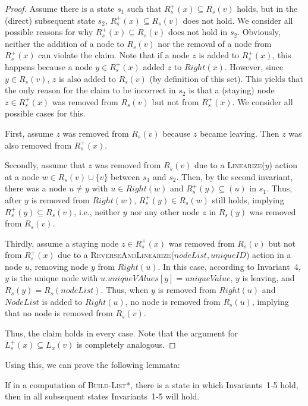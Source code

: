 \documentclass[a4paper,USenglish]{lipics}
\newcommand{\blpp}{\textsc{Build-List*}\xspace}
\newcommand{\linearize}[1]{\textsc{Linearize(\ensuremath{#1})}\xspace}
\newcommand{\rsp}{\ensuremath{R_s^+}\xspace}
\newcommand{\lsp}{\ensuremath{L_s^+}\xspace}
\newcommand{\revandlin}[1]{\textsc{ReverseAndLinearize(\ensuremath{#1})}\xspace} \newcommand{\revandlinREQ}[1]{\textsc{ReverseAndLinearizeREQ(#1)}\xspace}
\begin{document}
\begin{proof}
Assume there is a state $s_1$ such that $\rsp(x) \subseteq R_s(v)$ holds, but in the (direct) subsequent state $s_2$, $\rsp(x) \subseteq R_s(v)$ does not hold.
We consider all possible reasons for why $\rsp(x) \subseteq R_s(v)$ does not hold in $s_2$.
Obviously, neither the addition of a node to $R_s(v)$ nor the removal of a node from $\rsp(x)$ can violate the claim.
Note that if a node $z$ is added to $\rsp(x)$, this happens because a node $y \in \rsp(x)$ added $z$ to $Right(x)$.
However, since $y \in R_s(v)$, $z$ is also added to $R_s(v)$ (by definition of this set).
This yields that the only reason for the claim to be incorrect in $s_2$ is that a (staying) node $z \in \rsp(x)$ was removed from $R_s(v)$ but not from $\rsp(x)$.
We consider all possible cases for this.

First, assume $z$ was removed from $R_s(v)$ because $z$ became leaving.
Then $z$ was also removed from $\rsp(x)$.

Secondly, assume that $z$ was removed from $R_s(v)$ due to a \linearize{y} action at a node $w \in R_s(v) \cup \{v\}$ between $s_1$ and $s_2$.
Then, by the second invariant, there was a node $u \neq y$ with $u \in Right(w)$ and $\rsp(y) \subseteq(u)$ in $s_1$.
Thus, after $y$ is removed from $Right(w)$, $\rsp(y) \in R_s(w)$ still holds, implying $\rsp(y) \subseteq R_s(v)$, i.e., neither $y$ nor any other node $z$ in $R_s(y)$ was removed from $R_s(v)$.

Thirdly, assume a staying node $z \in \rsp(x)$ was removed from $R_s(v)$ but not from $\rsp(x)$ due to a \revandlin{nodeList,uniqueID} action in a node $u$, removing node $y$ from $Right(u)$.
In this case, according to Invariant~4, $y$ is the unique node with $u.uniqueVAlues[y] = uniqueValue$, $y$ is leaving, and $R_s(y) = R_s(nodeList)$.
Thus, when $y$ is removed from $Right(u)$ and $NodeList$ is added to $Right(u)$, no node is removed from $R_s(u)$, implying that no node is removed from $R_s(v)$.

Thus, the claim holds in every case.
Note that the argument for $\lsp(x) \subseteq L_x(v)$ is completely analogous.
\end{proof}
Using this, we can prove the following lemmata:
\begin{lemma}\label{lem:blpp_once_first_five_invariants_hold_then_always}
 If in a computation of \blpp, there is a state in which Invariants~1-5 hold, then in all subsequent states Invariants~1-5 will hold.
\end{lemma}
\end{document}
